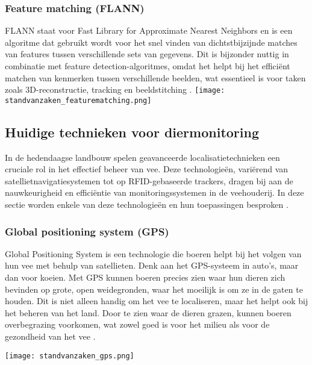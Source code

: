 \subsubsection{Feature matching (FLANN)}
FLANN staat voor Fast Library for Approximate Nearest Neighbors en is een algoritme dat gebruikt wordt voor het snel vinden van dichtstbijzijnde matches van features tussen verschillende sets van gegevens. Dit is bijzonder nuttig in combinatie met feature detection-algoritmes, omdat het helpt bij het efficiënt matchen van kenmerken tussen verschillende beelden, wat essentieel is voor taken zoals 3D-reconstructie, tracking en beeldstitching \autocite{Cong2016fast}.
\newline
\texttt{[image: standvanzaken\_featurematching.png]}
\newline

\subsection{Huidige technieken voor diermonitoring}
In de hedendaagse landbouw spelen geavanceerde localisatietechnieken een cruciale rol in het effectief beheer van vee. Deze technologieën, variërend van satellietnavigatiesystemen tot op RFID-gebaseerde trackers, dragen bij aan de nauwkeurigheid en efficiëntie van monitoringssystemen in de veehouderij. In deze sectie worden enkele van deze technologieën en hun toepassingen besproken \autocite{halachmi2019smart}.

\subsubsection{Global positioning system (GPS)}
Global Positioning System is een technologie die boeren helpt bij het volgen van hun vee met behulp van satellieten. 
Denk aan het GPS-systeem in auto's, maar dan voor koeien. Met GPS kunnen boeren precies zien waar hun dieren zich bevinden op grote, open weidegronden, waar het moeilijk is om ze in de gaten te houden. 
Dit is niet alleen handig om het vee te localiseren, maar het helpt ook bij het beheren van het land. Door te zien waar de dieren grazen, kunnen boeren overbegrazing voorkomen, wat zowel goed is voor het milieu als voor de gezondheid van het vee​​ \autocite{handcock2009monitoring}.

\texttt{[image: standvanzaken\_gps.png]}
